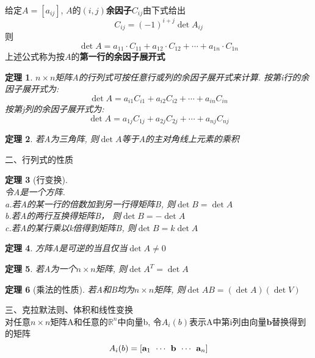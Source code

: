 \documentclass[UTF8, fontset=ubuntu]{ctexart}
\theoremstyle{nonumberplain}
\theoremstyle{plain}
\newtheorem{theorem}{定理}
\begin{document}
给定$A=[a_{ij}]$, $A$的$(i,j)$\textbf{余因子}$C_{ij}$由下式给出
\[C_{ij}=(-1)^{i+j}\det A_{ij}\]
则
\[\det A=a_{11}\cdot C_{11}+a_{12}\cdot C_{12}+\cdots+a_{1n}\cdot C_{1n}\]
上述公式称为按$A$的\textbf{第一行的余因子展开式}\\[2ex]

\begin{theorem}
$n\times n$矩阵A的行列式可按任意行或列的余因子展开式来计算. 按第i行的余因子展开式为:
\[\det A=a_{i1}C_{i1}+a_{i2}C_{i2}+\cdots+a_{in}C_{in}\]
按第j列的余因子展开式为:
\[\det A=a_{1j}C_{1j}+a_{2j}C_{2j}+\cdots+a_{nj}C_{nj}\]
\end{theorem}\vspace{4ex}

\begin{theorem}
若A为三角阵, 则$\det A$等于A的主对角线上元素的乘积
\end{theorem}\vspace{8ex}

二、行列式的性质\\[-3ex]
\begin{theorem}[行变换]\ \\
令A是一个方阵.\\
a.若A的某一行的倍数加到另一行得矩阵B, 则$\det B=\det A$\\
b.若A的两行互换得矩阵B， 则$\det B=-\det A$\\
c.若A的某行乘以k倍得到矩阵B, 则$\det B=k\det A$
\end{theorem}\vspace{4ex}

\begin{theorem}
方阵A是可逆的当且仅当$\det A\neq0$
\end{theorem}\vspace{4ex}

\begin{theorem}
若A为一个$n\times n$矩阵, 则$\det A^T=\det A$
\end{theorem}\vspace{4ex}

\begin{theorem}[乘法的性质]
若A和B均为$n\times n$矩阵, 则$\det AB=(\det A)(\det V)$
\end{theorem}\vspace{8ex}

三、克拉默法则、体积和线性变换\\[1ex]
对任意$n\times n$矩阵A和任意的$\mathbb{R}^n$中向量b, 令$A_i(b)$表示A中第i列由向量$\mathbf{b}$替换得到的矩阵
\[A_i(b)=[\mathbf{a}_1\hspace{1ex}\cdots\hspace{1ex}\mathbf{b}\hspace{1ex}\cdots\hspace{1ex}\mathbf{a}_n]\]\\[-1ex]
\end{document}
